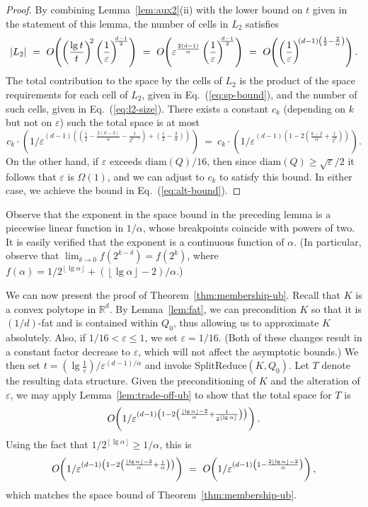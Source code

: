 \documentclass[11pt]{article}   \usepackage[letterpaper,hmargin=2.1cm,vmargin=3cm]{geometry}
\newcommand{\floor}[1]{\left\lfloor #1\right\rfloor}
\newcommand{\RE}{\mathbb{R}}    \newcommand{\ZZ}{\mathbb{Z}}    \newcommand{\eps}{\varepsilon}  \newcommand{\ST}{\,:\,}         \newcommand{\sq}{\square}
\newcommand{\OO}[1]{O\kern-2pt\left(#1\right)}  \newcommand{\half}[1]{\frac{#1}{2}}
\newcommand{\inv}[1]{\frac{1}{#1}}
\newcommand{\alg}{\textrm{SplitReduce}}
\newcommand{\diam}{\mathrm{diam}}
\begin{document}
\begin{proof}
By combining Lemma~\ref{lem:aux2}(ii) with the lower bound on $t$ given in the statement of this lemma, the number of cells in $L_2$ satisfies
\begin{equation} \label{eq:l2-size}
	|L_2|
		~ = ~ \OO{\left(\frac{\lg t}{t}\right)^{\N 2} \left( \inv{\eps} \right)^{\NN \frac{d-1}{2}}}
		~ = ~ \OO{\eps^{\frac{2(d-1)}{\alpha}}  \left( \inv{\eps} \right)^{\NN \frac{d-1}{2}}}
		~ = ~ \OO{\left( \inv{\eps} \right)^{\N (d-1)\left(\inv{2} - \frac{2}{\alpha}\right)}}.
\end{equation}
The total contribution to the space by the cells of $L_2$ is the product of the space requirements for each cell of $L_2$, given in Eq.~(\ref{eq:sp-bound}), and the number of such cells, given in Eq.~(\ref{eq:l2-size}). There exists a constant $c_k$ (depending on $k$ but not on $\eps$) such the total space is at most
\[
	c_k \cdot \left( 1/\eps^{(d-1) \left( \left(\inv{2} - \frac{2(k - 3)}{\alpha} - \inv{2^{k-1}}\right) + \left(\inv{2} - \frac{2}{\alpha}\right) \right)} \right)	
		~ = ~
	c_k \cdot \left( 1/\eps^{(d-1) \left(1 - 2 \left(\frac{k - 2}{\alpha} + \inv{2^k}\right) \right)} \right).
\]
On the other hand, if $\eps$ exceeds $\diam(Q)/16$, then since $\diam(Q) \ge \sqrt{\eps}/2$ it follows that $\eps$ is $\Omega(1)$, and we can adjust to $c_k$ to satisfy this bound. In either case, we achieve the bound in Eq.~(\ref{eq:alt-bound}). 
\end{proof}


Observe that the exponent in the space bound in the preceding lemma is a piecewise linear function in $1/\alpha$, whose breakpoints coincide with powers of two. It is easily verified that the exponent is a continuous function of $\alpha$. (In particular, observe that $\lim_{\delta \rightarrow 0} f(2^{k-\delta}) = f(2^{k})$, where $f(\alpha) = 1/2^{\floor{\lg \alpha}} + (\floor{\lg \alpha}-2)/\alpha$.)

\medskip

We can now present the proof of Theorem~\ref{thm:membership-ub}. Recall that $K$ is a convex polytope in $\RE^d$. By Lemma~\ref{lem:fat}, we can precondition $K$ so that it is $(1/d)$-fat and is contained within $Q_0$, thus allowing us to approximate $K$ absolutely. Also, if $1/16 < \eps \le 1$, we set $\eps = 1/16$. (Both of these changes result in a constant factor decrease to $\eps$, which will not affect the asymptotic bounds.) We then set $t = (\lg \inv{\eps})/\eps^{(d-1)/\alpha}$ and invoke $\alg(K, Q_0)$. Let $T$ denote the resulting data structure. Given the preconditioning of $K$ and the alteration of $\eps$, we may apply Lemma~\ref{lem:trade-off-ub} to show that the total space for $T$ is 
\[
	\OO{1/\eps^{(d-1)\left(1 - 2 \left(\frac{\floor{\lg \alpha} - 2}{\alpha} + \inv{2^{\floor{\lg\alpha}}}\right) \right)}}.
\]
Using the fact that $1/2^{\floor{\lg\alpha}} \ge 1/\alpha$, this is
\[
	\OO{1/\eps^{(d-1)\left(1 - 2 \left(\frac{\floor{\lg \alpha} - 2}{\alpha} + \inv{\alpha}\right) \right)}}
		~ = ~
	\OO{1/\eps^{\left(d-1\right)\left(1 - \frac{2\floor{\lg \alpha} - 2}{\alpha} \right)}},
\]
which matches the space bound of Theorem~\ref{thm:membership-ub}.
\end{document}
